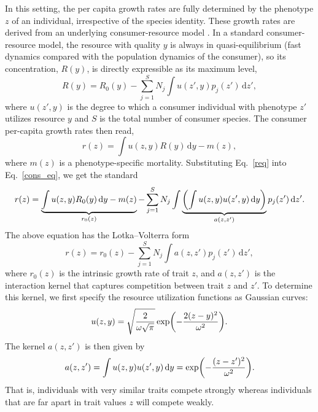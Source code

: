 \documentclass[10pt]{article}
\newcommand{\ud}{\text{d}}
\let\originalleft\left
\let\originalright\right
\renewcommand{\left}{\mathopen{}\mathclose\bgroup\originalleft}
\renewcommand{\right}{\aftergroup\egroup\originalright}
\begin{document}
In this setting, the per capita growth rates are fully determined by the phenotype $z$ of an individual, irrespective of the species identity. These growth rates are derived from an underlying consumer-resource model \citep{macarthur_packing_1970}. In a standard consumer-resource model, the resource with quality $y$ is always in quasi-equilibrium (fast dynamics compared with the population dynamics of the consumer), so its concentration, $R(y)$, is directly expressible as its maximum level, 
\begin{equation}
    \label{req}
    R(y) = R_0(y)-\sum_{j=1}^S N_j \int u(z',y) p_j(z') \,\text{d} z' ,
\end{equation}
where $u(z', y)$ is the degree to which a consumer individual with phenotype $z'$ utilizes resource $y$ and $S$ is the total number of consumer species. The consumer per-capita growth rates then read,
\begin{equation}
    \label{cons_eq}
    r(z) = \int u(z,y) R(y) \,\text{d} y - m(z)  ,
\end{equation}
where $m(z)$ is a phenotype-specific mortality. Substituting Eq.~\ref{req} into Eq.~\ref{cons_eq}, we get the standard
\begin{equation}
  \label{gauss-rz}
  r(z) = \underbrace{\int u(z,y) R_0(y) \,\text{d} y - m(z)}_{r_0(z)} - \sum_{j=1}^S N_j \int \underbrace{\left( \int u(z, y) u(z',y) \,\text{d} y\right)}_{a(z,z')} p_j(z') \,\text{d} z' .
\end{equation}
The above equation has the Lotka--Volterra form
\begin{equation}
  \label{eq:pgr}
  r(z) = r_0(z) - \sum_{j=1}^S N_j \int a(z,z') p_j(z') \,\ud z' ,
\end{equation}
where $r_0(z)$ is the intrinsic growth rate of trait $z$, and $a(z,z')$ is the interaction kernel that captures competition between trait $z$ and $z'$. To determine this kernel, we first specify the resource utilization functions as Gaussian curves:
\begin{equation}
  \label{gauss_util}
  u(z,y) = \sqrt{\frac{2}{\omega \sqrt{\pi}}}\exp\left(-\frac{2(z-y)^2}{\omega^2} \right) .
\end{equation}
The kernel $a(z,z')$ is then given by
\begin{equation}
\label{gauss_k}
  a(z, z') = \int u(z, y) u(z',y) \,\text{d} y = \exp \left(-\frac{(z-z')^2}{\omega^2} \right) .
\end{equation}
%
That is, individuals with very similar traits compete strongly whereas individuals that are far apart in trait values $z$ will compete weakly.
\end{document}
